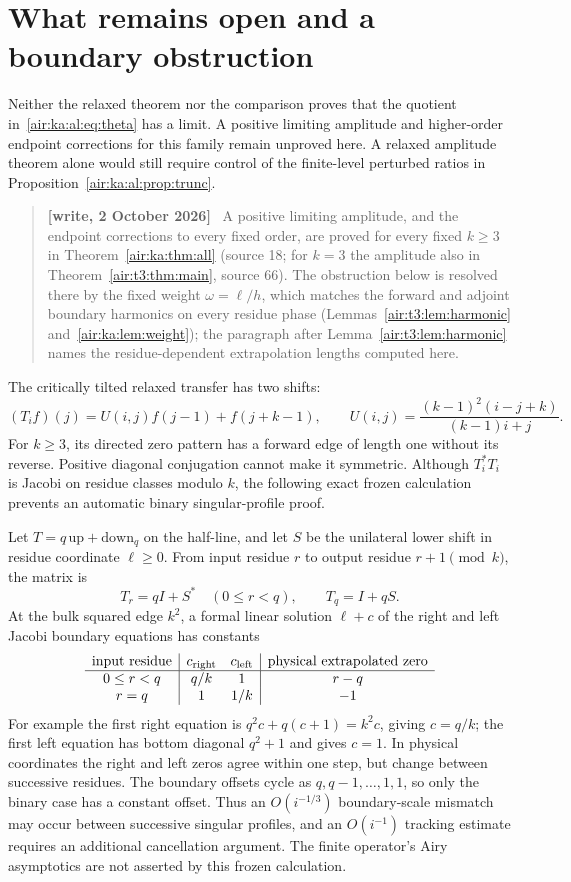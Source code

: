 \documentclass[11pt,letterpaper]{article}
\numberwithin{equation}{section}
\theoremstyle{remark}
\newenvironment{writenote}{\par\smallskip\begin{quote}\small\textbf{[write, 2 October 2026]}\ }{\end{quote}\smallskip}
\begin{document}
\section{What remains open and a boundary obstruction}\label{air:ka:al:sec:open}
Neither the relaxed theorem nor the comparison proves that the quotient
in~\eqref{air:ka:al:eq:theta} has a limit. A positive limiting amplitude and
higher-order endpoint corrections for this family remain unproved here.
A relaxed amplitude theorem alone would still require control of the
finite-level perturbed ratios in Proposition~\ref{air:ka:al:prop:trunc}.
\begin{writenote}
A positive limiting amplitude, and the endpoint corrections to every fixed order, are proved for every fixed $k\ge3$ in Theorem~\ref{air:ka:thm:all} (source 18; for $k=3$ the amplitude also in Theorem~\ref{air:t3:thm:main}, source 66). The obstruction below is resolved there by the fixed weight $\omega=\ell/h$, which matches the forward and adjoint boundary harmonics on every residue phase (Lemmas~\ref{air:t3:lem:harmonic} and~\ref{air:ka:lem:weight}); the paragraph after Lemma~\ref{air:t3:lem:harmonic} names the residue-dependent extrapolation lengths computed here.
\end{writenote}


The critically tilted relaxed transfer has two shifts:
\[
(T_if)(j)=U(i,j)f(j-1)+f(j+k-1),\qquad
U(i,j)=\frac{(k-1)^2(i-j+k)}{(k-1)i+j}.
\]
For $k\ge3$, its directed zero pattern has a forward edge of length one
without its reverse. Positive diagonal conjugation cannot make it symmetric.
Although $T_i^*T_i$ is Jacobi on residue classes modulo $k$, the following
exact frozen calculation prevents an automatic binary singular-profile proof.

Let $T=q\,\mathrm{up}+\mathrm{down}_q$ on the half-line, and let $S$ be the
unilateral lower shift in residue coordinate $\ell\ge0$. From input residue
$r$ to output residue $r+1\pmod k$, the matrix is
\[
T_r=qI+S^*\quad(0\le r<q),\qquad T_q=I+qS.
\]
At the bulk squared edge $k^2$, a formal linear solution $\ell+c$ of the
right and left Jacobi boundary equations has constants
\[
\begin{array}{c|cc|c}
\text{input residue}&c_{\rm right}&c_{\rm left}&
\text{physical extrapolated zero}\\\hline
0\le r<q&q/k&1&r-q\\
r=q&1&1/k&-1
\end{array}
\]
For example the first right equation is
$q^2c+q(c+1)=k^2c$, giving $c=q/k$; the first left equation has bottom
diagonal $q^2+1$ and gives $c=1$. In physical coordinates the right and
left zeros agree within one step, but change between successive residues.
The boundary offsets cycle as $q,q-1,\ldots,1,1$, so only the binary case
has a constant offset. Thus an $O(i^{-1/3})$ boundary-scale mismatch may
occur between successive singular profiles, and an $O(i^{-1})$ tracking
estimate requires an additional cancellation argument. The finite operator's
Airy asymptotics are not asserted by this frozen calculation.
\end{document}
